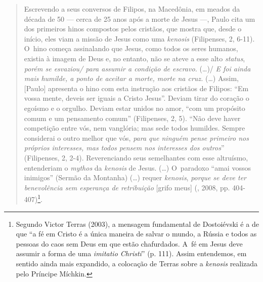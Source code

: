 \begin{quote}
Escrevendo a seus conversos de Filipos, na Macedônia, em meados da
década de 50 --- cerca de 25 anos após a morte de Jesus ---, Paulo cita um
dos primeiros hinos compostos pelos cristãos, que mostra que, desde o
início, eles viam a missão de Jesus como uma \emph{kenosis} (Filipenses,
2, 6-11). O~hino começa assinalando que Jesus, como todos os seres
humanos, existia à imagem de Deus e, no entanto, não se ateve a esse
alto \emph{status}, \emph{porém se esvaziou/ para assumir a condição de
escravo.} (\ldots)/ \emph{E foi ainda mais humilde, a ponto de aceitar a
morte, morte na cruz.} (\ldots) Assim, {[}Paulo{]} apresenta o hino com
esta instrução aos cristãos de Filipos: ``Em vossa mente, deveis ser
iguais a Cristo Jesus''. Deviam tirar do coração o egoísmo e o orgulho.
Deviam estar unidos no amor, ``com um propósito comum e um pensamento
comum'' (Filipenses, 2, 5). ``Não deve haver competição entre vós, nem
vanglória; mas sede todos humildes. Sempre considerai o outro melhor que
vós, \emph{para que ninguém pense primeiro nos próprios interesses, mas
todos pensem nos interesses dos outros}'' (Filipenses, 2, 2-4).
Reverenciando seus semelhantes com esse altruísmo, entenderiam o
\emph{mythos} da \emph{kenosis} de Jesus. (\ldots) O~paradoxo ``amai vossos
inimigos'' (Sermão da Montanha) (\ldots) requer \emph{kenosis},
\emph{porque se deve ter benevolência sem esperança de retribuição}
{[}grifo meus{]} (, 2008, pp. 404-407)\footnote{Segundo Victor
  Terras (2003), a mensagem fundamental de Dostoiévski é a de que ``a fé
  em Cristo é a única maneira de salvar o mundo, a Rússia e todos as
  pessoas do caos sem Deus em que estão chafurdados. A~fé em Jesus deve
  assumir a forma de uma \emph{imitatio Christi}'' (p. 111). Assim
  entendemos, em sentido ainda mais expandido, a colocação de Terras
  sobre a \emph{kenosis} realizada pelo Príncipe Míchkin.}.
\end{quote}

